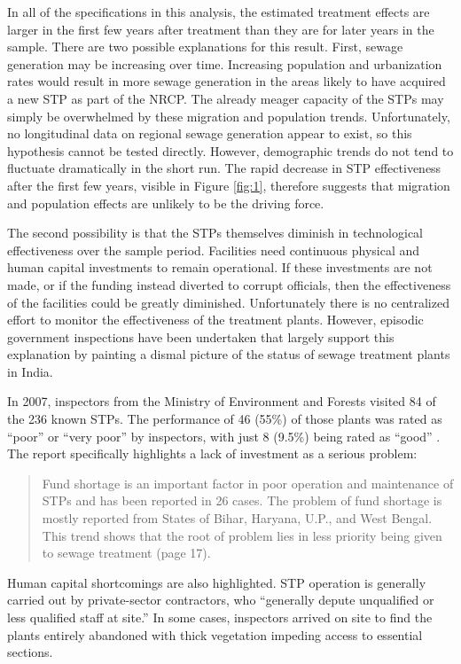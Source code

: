 \documentclass[12pt]{article}
\begin{document}
In all of the specifications in this analysis, the estimated treatment effects are larger in the first few years after treatment than they are for later years in the sample. There are two possible explanations for this result. First, sewage generation may be increasing over time. Increasing population and urbanization rates would result in more sewage generation in the areas likely to have acquired a new STP as part of the NRCP. The already meager capacity of the STPs may simply be overwhelmed by these migration and population trends. Unfortunately, no longitudinal data on regional sewage generation appear to exist, so this hypothesis cannot be tested directly. However, demographic trends do not tend to fluctuate dramatically in the short run. The rapid decrease in STP effectiveness after the first few years, visible in Figure \ref{fig:1}, therefore suggests that migration and population effects are unlikely to be the driving force. 

The second possibility is that the STPs themselves diminish in technological effectiveness over the sample period. Facilities need continuous physical and human capital investments to remain operational. If these investments are not made, or if the funding instead diverted to corrupt officials, then the effectiveness of the facilities could be greatly diminished. Unfortunately there is no centralized effort to monitor the effectiveness of the treatment plants. However, episodic government inspections have been undertaken that largely support this explanation by painting a dismal picture of the status of sewage treatment plants in India.

In 2007, inspectors from the Ministry of Environment and Forests visited 84 of the 236 known STPs. The performance of 46 (55\%) of those plants was rated as ``poor'' or ``very poor'' by inspectors, with just 8 (9.5\%) being rated as ``good'' \citep{cpcb2008}. The report specifically highlights a lack of investment as a serious problem:
\begin{quotation}
Fund shortage is an important factor in poor operation and maintenance of STPs and has
been reported in 26 cases. The problem of fund shortage is mostly reported from States of
Bihar, Haryana, U.P., and West Bengal. This trend shows that the root of problem lies in
less priority being given to sewage treatment (page 17).
\end{quotation}
Human capital shortcomings are also highlighted. STP operation is generally carried out by private-sector contractors, who ``generally depute unqualified or less qualified staff at site.'' In some cases, inspectors arrived on site to find the plants entirely abandoned with thick vegetation impeding access to essential sections. 
\end{document}
